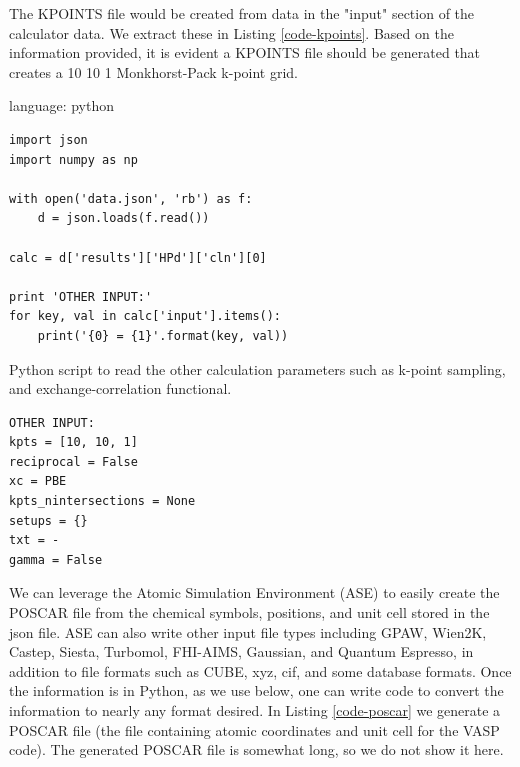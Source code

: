 \documentclass[journal=accacs,manuscript=article,email=true]{achemso}
\begin{document}
The KPOINTS file would be created from data in the "input" section of the calculator data. We extract these in Listing \ref{code-kpoints}. Based on the information provided, it is evident a KPOINTS file should be generated that creates a 10 \texttimes{} 10 \texttimes{} 1 Monkhorst-Pack k-point grid.

\begin{tcolorbox}
language: python\begin{listing}[H]
\begin{verbatim}
import json
import numpy as np

with open('data.json', 'rb') as f:
    d = json.loads(f.read())

calc = d['results']['HPd']['cln'][0]

print 'OTHER INPUT:'
for key, val in calc['input'].items():
    print('{0} = {1}'.format(key, val))
\end{verbatim}
\caption{Python script to read the other calculation parameters such as k-point sampling, and exchange-correlation functional. \label{code-kpoints}}
\end{listing}
\end{tcolorbox}

\begin{verbatim}
OTHER INPUT:
kpts = [10, 10, 1]
reciprocal = False
xc = PBE
kpts_nintersections = None
setups = {}
txt = -
gamma = False
\end{verbatim}

We can leverage the Atomic Simulation Environment (ASE) \cite{bahn-2002} to easily create the POSCAR file from the chemical symbols, positions, and unit cell stored in the json file. ASE can also write other input file types including GPAW, Wien2K, Castep, Siesta, Turbomol, FHI-AIMS, Gaussian, and Quantum Espresso, in addition to file formats such as CUBE, xyz, cif, and some database formats. Once the information is in Python, as we use below, one can write code to convert the information to nearly any format desired. In Listing \ref{code-poscar} we generate a POSCAR file (the file containing atomic coordinates and unit cell for the VASP code). The generated POSCAR file is somewhat long, so we do not show it here.
\end{document}
